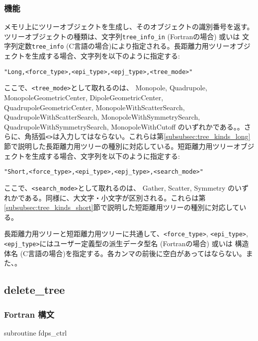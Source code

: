 \subsubsection*{機能}
メモリ上にツリーオブジェクトを生成し、そのオブジェクトの識別番号を返す。ツリーオブジェクトの種類は、文字列\verb|tree_info_in| {\small (Fortranの場合)} 或いは 文字列定数\verb|tree_info| {\small (C言語の場合)}により指定される。長距離力用ツリーオブジェクトを生成する場合、文字列を以下のように指定する:
\begin{screen}
\verb|"Long,<force_type>,<epi_type>,<epj_type>,<tree_mode>"|
\end{screen}
ここで、\verb|<tree_mode>|として取れるのは、
Monopole,
Quadrupole,
MonopoleGeometricCenter,
DipoleGeometricCenter,
QuadrupoleGeometricCenter,
MonopoleWithScatterSearch, \newline
QuadrupoleWithScatterSearch,
MonopoleWithSymmetrySearch, \newline
QuadrupoleWithSymmetrySearch, 
MonopoleWithCutoff
のいずれかである。{\setnoko{}}。さらに、角括弧\verb|<>|は入力してはならない。これらは第\ref{subsubsec:tree_kinds_long}節で説明した長距離力用ツリーの種別に対応している。短距離力用ツリーオブジェクトを生成する場合、文字列を以下のように指定する:
\begin{screen}
\verb|"Short,<force_type>,<epi_type>,<epj_type>,<search_mode>"|
\end{screen}
ここで、\verb|<search_mode>|として取れるのは、
Gather,
Scatter,
Symmetry
のいずれかである。同様に、大文字・小文字が区別される。これらは第\ref{subsubsec:tree_kinds_short}節で説明した短距離用ツリーの種別に対応している。

長距離力用ツリーと短距離力用ツリーに共通して、\verb|<force_type>|, \verb|<epi_type>|, \verb|<epj_type>|にはユーザー定義型の派生データ型名 {\small (Fortranの場合)} 或いは 構造体名 {\small (C言語の場合)}を指定する。各カンマの前後に空白があってはならない。また、{\setnoko{}}。
\clearpage

\subsection{delete\_tree}
\subsubsection*{Fortran 構文}
\begin{screen}
\begin{spverbatim}
subroutine fdps_ctrl%
\end{spverbatim}
\end{screen}

